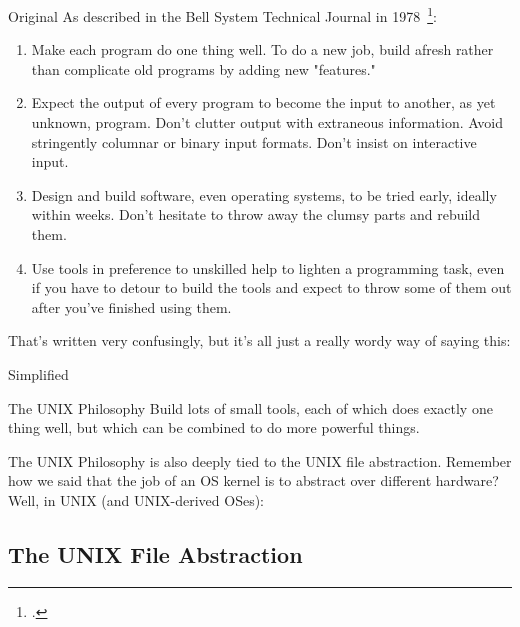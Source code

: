 \begin{frame}{Original}
  As described in the Bell System Technical Journal in 1978~\footcite{mcilroy:unix}:
  {
    \small
    \begin{enumerate}
      \item
        Make each program do one thing well. To do a new job, build afresh rather
        than complicate old programs by adding new "features."
      \item
        Expect the output of every program to become the input to another, as yet
        unknown, program. Don't clutter output with extraneous information. Avoid
        stringently columnar or binary input formats. Don't insist on interactive
        input.
      \item
        Design and build software, even operating systems, to be tried early,
        ideally within weeks. Don't hesitate to throw away the clumsy parts and
        rebuild them.
      \item
        Use tools in preference to unskilled help to lighten a programming task,
        even if you have to detour to build the tools and expect to throw some of
        them out after you've finished using them.
    \end{enumerate}
  }
\end{frame}

That's written very confusingly, but it's all just a really wordy way of saying this:

\begin{frame}[c]{Simplified}
  \begin{block}{The UNIX Philosophy}
    Build lots of small tools, each of which does exactly one thing well, but
    which can be combined to do more powerful things.
  \end{block}
\end{frame}

The UNIX Philosophy is also deeply tied to the UNIX file abstraction.  Remember
how we said that the job of an OS kernel is to abstract over different
hardware?  Well, in UNIX (and UNIX-derived OSes):

\subsection{The UNIX File Abstraction}

